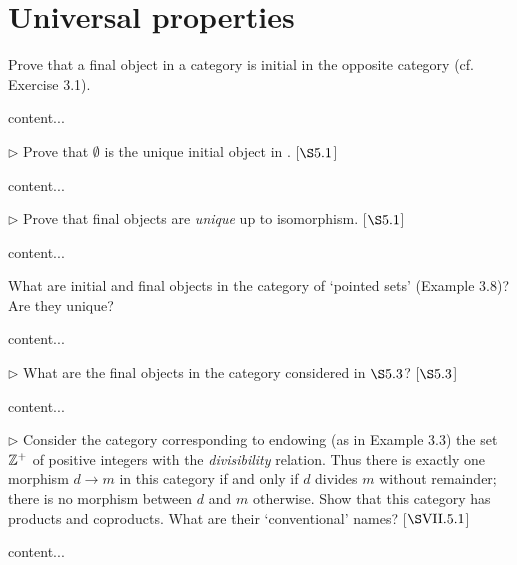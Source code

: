 \section{Universal properties}
\extitle
	
\begin{exercise}
	Prove that a final object in a category  is initial in the opposite category   (cf. Exercise 3.1).
\end{exercise}
\begin{solution}
	content...
\end{solution}

\begin{exercise}
	\(\triangleright\) Prove that \(\emptyset\) is the unique initial object in . [\(\S 5.1\)]
\end{exercise}
\begin{solution}
	content...
\end{solution}

\begin{exercise}
	\(\triangleright\) Prove that final objects are \textit{unique} up to isomorphism. [\(\S 5.1\)]
\end{exercise}
\begin{solution}
	content...
\end{solution}

\begin{exercise}
	What are initial and final objects in the category of ‘pointed sets’ (Example 3.8)? Are they unique?
\end{exercise}
\begin{solution}
	content...
\end{solution}

\begin{exercise}
	\(\triangleright\) What are the final objects in the category considered in \(\S 5.3\)? [\(\S 5.3\)]
\end{exercise}
\begin{solution}
	content...
\end{solution}

\begin{exercise}
	\(\triangleright\) Consider the category corresponding to endowing (as in Example 3.3) the set \(\mathbb{Z}^+\) of positive integers with the \textit{divisibility} relation. Thus there is exactly one morphism \(d \to m\) in this category if and only if \(d\) divides \(m\) without remainder; there is no morphism between \(d\) and \(m\) otherwise. Show that this category has products and coproducts. What are their ‘conventional’ names? [\(\S \RN{7}.5.1\)]
\end{exercise}
\begin{solution}
	content...
\end{solution}


